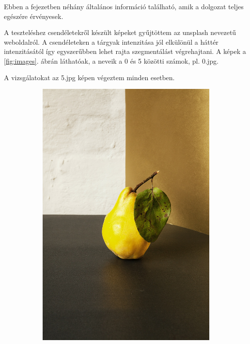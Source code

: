 
Ebben a fejezetben néhány általános információ található, amik a dolgozat teljes egészére érvényesek.


A teszteléshez csendéletekről készült képeket gyűjtöttem az unsplash nevezetű weboldalról. \cite{unsplash}
A csendéleteken a tárgyak intenzitása jól elkülönül a háttér intenzitásától így egyszerűbben lehet rajta szegmentálást végrehajtani.
A képek a \ref{fig:images}. ábrán láthatóak, a neveik a 0 és 5 közötti számok, pl. 0.jpg.

A vizsgálatokat az 5.jpg képen végeztem minden esetben.

\begin{figure}[htb]
    \centering %
\begin{subfigure}{0.25\textwidth}
  \includegraphics[width=\linewidth]{../images/0.jpg}

\end{subfigure}
\end{figure}

